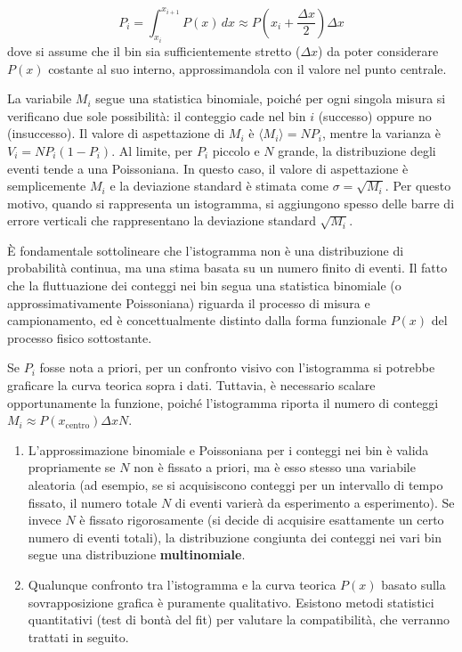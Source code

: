 \documentclass{article}
\theoremstyle{remark}
\begin{document}
\begin{equation}
P_i = \int_{x_i}^{x_{i+1}} P(x) \, dx \approx P\left(x_i + \frac{\Delta x}{2}\right) \Delta x
\end{equation}
dove si assume che il bin sia sufficientemente stretto ($\Delta x$) da poter considerare $P(x)$ costante al suo interno, approssimandola con il valore nel punto centrale.

La variabile $M_i$ segue una statistica binomiale, poiché per ogni singola misura si verificano due sole possibilità: il conteggio cade nel bin $i$ (successo) oppure no (insuccesso).
Il valore di aspettazione di $M_i$ è $\langle M_i \rangle = N P_i$, mentre la varianza è $V_i = N P_i (1-P_i)$.
Al limite, per $P_i$ piccolo e $N$ grande, la distribuzione degli eventi tende a una Poissoniana. In questo caso, il valore di aspettazione è semplicemente $M_i$ e la deviazione standard è stimata come $\sigma = \sqrt{M_i}$.
Per questo motivo, quando si rappresenta un istogramma, si aggiungono spesso delle barre di errore verticali che rappresentano la deviazione standard $\sqrt{M_i}$.

È fondamentale sottolineare che l'istogramma non è una distribuzione di probabilità continua, ma una stima basata su un numero finito di eventi. Il fatto che la fluttuazione dei conteggi nei bin segua una statistica binomiale (o approssimativamente Poissoniana) riguarda il processo di misura e campionamento, ed è concettualmente distinto dalla forma funzionale $P(x)$ del processo fisico sottostante.

Se $P_i$ fosse nota a priori, per un confronto visivo con l'istogramma si potrebbe graficare la curva teorica sopra i dati. Tuttavia, è necessario scalare opportunamente la funzione, poiché l'istogramma riporta il numero di conteggi $M_i \approx P(x_{\text{centro}}) \Delta x N$.

\begin{nota}
    
\begin{enumerate}
    \item L'approssimazione binomiale e Poissoniana per i conteggi nei bin è valida propriamente se $N$ non è fissato a priori, ma è esso stesso una variabile aleatoria (ad esempio, se si acquisiscono conteggi per un intervallo di tempo fissato, il numero totale $N$ di eventi varierà da esperimento a esperimento). Se invece $N$ è fissato rigorosamente (si decide di acquisire esattamente un certo numero di eventi totali), la distribuzione congiunta dei conteggi nei vari bin segue una distribuzione \textbf{multinomiale}.
    \item Qualunque confronto tra l'istogramma e la curva teorica $P(x)$ basato sulla sovrapposizione grafica è puramente qualitativo. Esistono metodi statistici quantitativi (test di bontà del fit) per valutare la compatibilità, che verranno trattati in seguito.
\end{enumerate}
\end{nota}
\end{document}
